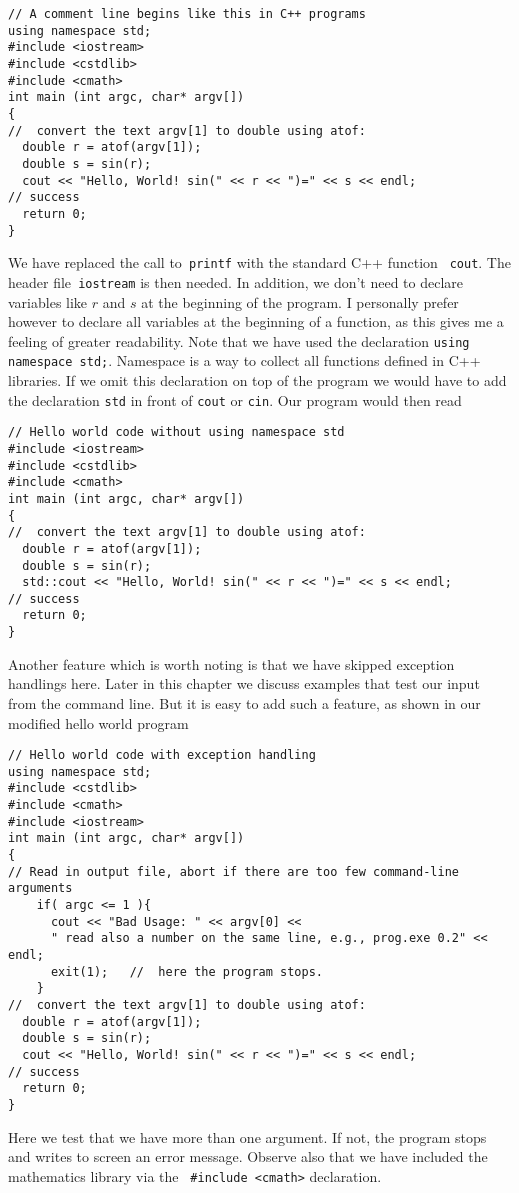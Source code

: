 \begin{lstlisting}[title={\href{{https://github.com/CompPhysics/CompPhysBook1/tree/master/doc/Programs/Chapter2/cpp/program2.cpp}}{Click here to view code}}]
// A comment line begins like this in C++ programs
using namespace std;
#include <iostream>
#include <cstdlib>
#include <cmath>
int main (int argc, char* argv[])
{
//  convert the text argv[1] to double using atof: 
  double r = atof(argv[1]); 
  double s = sin(r);
  cout << "Hello, World! sin(" << r << ")=" << s << endl;
// success 
  return 0;  
}
\end{lstlisting}
We have replaced the call to\verb? printf? with the standard C++ function
\verb? cout?. The header file\verb? iostream? is then needed.
In addition, we don't need to 
declare variables like $r$ and $s$  at the beginning of the program. 
I personally prefer
however to declare all variables at the beginning of a function, as this
gives me a feeling of greater readability.
Note that we have used the declaration \verb?using namespace std;?. Namespace is a 
way to collect 
all functions defined in C++ libraries. If we omit this declaration on top of the program
we would have to add the declaration \verb?std? in front of  
\verb?cout? or \verb?cin?.  Our program would then read
\begin{lstlisting}[title={\href{{https://github.com/CompPhysics/CompPhysBook1/tree/master/doc/Programs/Chapter2/cpp/program3.cpp}}{Click here to view code}}]
// Hello world code without using namespace std
#include <iostream>
#include <cstdlib>
#include <cmath>
int main (int argc, char* argv[])
{
//  convert the text argv[1] to double using atof: 
  double r = atof(argv[1]); 
  double s = sin(r);
  std::cout << "Hello, World! sin(" << r << ")=" << s << endl;
// success 
  return 0;  
}
\end{lstlisting}

Another feature which is worth noting is that we have skipped exception handlings here.
Later in this chapter we discuss examples that test our input from the command
line.  But it is easy to add such a feature, as shown in our modified hello world program
\begin{lstlisting}[title={\href{{https://github.com/CompPhysics/CompPhysBook1/tree/master/doc/Programs/Chapter2/cpp/program4.cpp}}{Click here to view code}}]
// Hello world code with exception handling
using namespace std;
#include <cstdlib>
#include <cmath>
#include <iostream>
int main (int argc, char* argv[])
{
// Read in output file, abort if there are too few command-line arguments
    if( argc <= 1 ){
      cout << "Bad Usage: " << argv[0] <<
      " read also a number on the same line, e.g., prog.exe 0.2" << endl;
      exit(1);   //  here the program stops.
    }
//  convert the text argv[1] to double using atof: 
  double r = atof(argv[1]); 
  double s = sin(r);
  cout << "Hello, World! sin(" << r << ")=" << s << endl;
// success 
  return 0;  
}
\end{lstlisting}
Here we test that we have more than one argument. If not, the program stops and writes to screen
an error message. Observe also that we have included the mathematics library via the 
\verb? #include <cmath>?  declaration.



